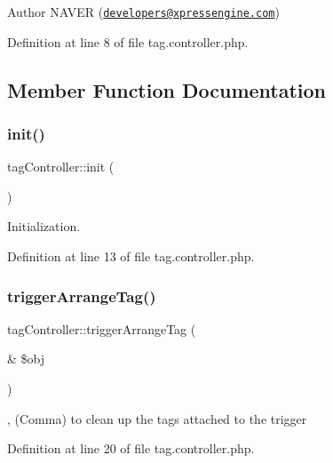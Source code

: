 \begin{DoxyAuthor}{Author}
N\+A\+V\+ER (\href{mailto:developers@xpressengine.com}{\tt developers@xpressengine.\+com}) 
\end{DoxyAuthor}


Definition at line 8 of file tag.\+controller.\+php.



\subsection{Member Function Documentation}
\mbox{\label{classtagController_ada37b0f9e302b94d20dcc5f7168afb3b}} 
\subsubsection{\texorpdfstring{init()}{init()}}
{\footnotesize\ttfamily tag\+Controller\+::init (\begin{DoxyParamCaption}{ }\end{DoxyParamCaption})}



Initialization. 



Definition at line 13 of file tag.\+controller.\+php.

\mbox{\label{classtagController_a22edcccfa0ab6967230adf5a3d1bab27}} 
\subsubsection{\texorpdfstring{trigger\+Arrange\+Tag()}{triggerArrangeTag()}}
{\footnotesize\ttfamily tag\+Controller\+::trigger\+Arrange\+Tag (\begin{DoxyParamCaption}\item[{\&}]{\$obj }\end{DoxyParamCaption})}



, (Comma) to clean up the tags attached to the trigger 



Definition at line 20 of file tag.\+controller.\+php.

